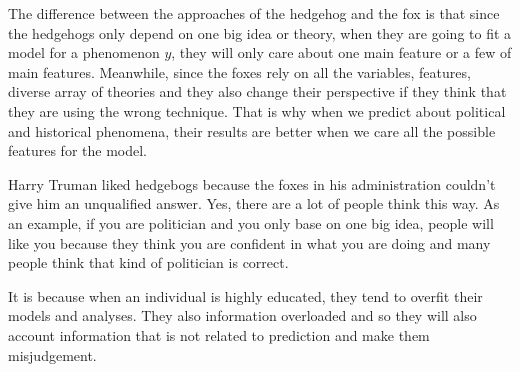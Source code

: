 \documentclass[12pt]{article}
\begin{document}


\begin{enumerate}


The difference between the approaches of the hedgehog and the fox is that since the hedgehogs only depend on one big idea or theory, when they are going to fit a model for a phenomenon $y$, they will only care about one main feature or a few of main features. Meanwhile, since the foxes rely on all the variables, features, diverse array of theories and they also change their perspective if they think that they are using the wrong technique. That is why when we predict about political and historical phenomena, their results are better when we care all the possible features for the model.


Harry Truman liked hedgebogs because the foxes in his administration couldn't give him an unqualified answer. Yes, there are a lot of people think this way. As an example, if you are politician and you only base on one big idea, people will like you because they think you are confident in what you are doing and many people think that kind of politician is correct. 


It is because when an individual is highly educated, they tend to overfit their models and analyses. They also information overloaded and so they will also account information that is not related to prediction and make them misjudgement.




\end{enumerate}
\end{document}

